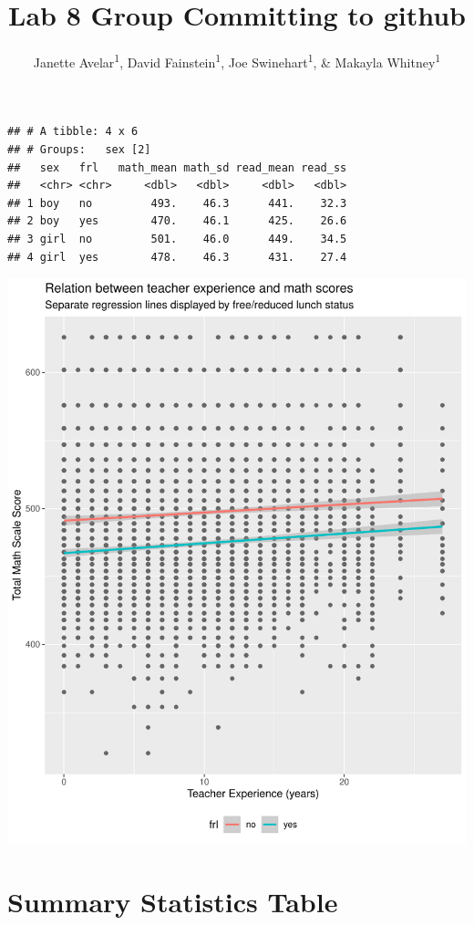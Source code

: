\documentclass[
  english,
  man]{apa6}
\title{Lab 8 Group Committing to github}
\author{Janette Avelar\textsuperscript{1}, David Fainstein\textsuperscript{1}, Joe Swinehart\textsuperscript{1}, \& Makayla Whitney\textsuperscript{1}}
\date{}
\affiliation{\vspace{0.5cm}\textsuperscript{1} University of Oregon}
\begin{document}
\maketitle

\begin{verbatim}
## # A tibble: 4 x 6
## # Groups:   sex [2]
##   sex   frl   math_mean math_sd read_mean read_ss
##   <chr> <chr>     <dbl>   <dbl>     <dbl>   <dbl>
## 1 boy   no         493.    46.3      441.    32.3
## 2 boy   yes        470.    46.1      425.    26.6
## 3 girl  no         501.    46.0      449.    34.5
## 4 girl  yes        478.    46.3      431.    27.4
\end{verbatim}

\includegraphics{lab_8_files/figure-latex/graph-1.pdf}

\hypertarget{summary-statistics-table}{%
\section{Summary Statistics Table}\label{summary-statistics-table}}
\end{document}
